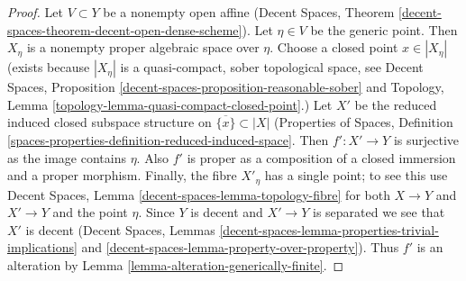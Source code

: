 \documentclass[10pt,a4paper]{amsart}
\theoremstyle{plain}
\theoremstyle{definition}
\theoremstyle{remark}
\numberwithin{equation}{subsection}
\begin{document}
\begin{proof}
Let $V \subset Y$ be a nonempty open affine
(Decent Spaces, Theorem \ref{decent-spaces-theorem-decent-open-dense-scheme}).
Let $\eta \in V$ be the generic point. Then
$X_\eta$ is a nonempty proper algebraic space over $\eta$.
Choose a closed point $x \in |X_\eta|$
(exists because $|X_\eta|$ is a quasi-compact, sober
topological space, see Decent Spaces, Proposition
\ref{decent-spaces-proposition-reasonable-sober}
and Topology, Lemma \ref{topology-lemma-quasi-compact-closed-point}.)
Let $X'$ be the reduced induced closed subspace structure on
$\overline{\{x\}} \subset |X|$ (Properties of Spaces, Definition
\ref{spaces-properties-definition-reduced-induced-space}.
Then $f' : X' \to Y$ is surjective as the image contains $\eta$.
Also $f'$ is proper as a composition of a closed immersion
and a proper morphism. Finally, the fibre $X'_\eta$ has a
single point; to see this use
Decent Spaces, Lemma \ref{decent-spaces-lemma-topology-fibre}
for both $X \to Y$ and $X' \to Y$ and the point $\eta$.
Since $Y$ is decent and $X' \to Y$ is separated we see that $X'$ is decent
(Decent Spaces, Lemmas
\ref{decent-spaces-lemma-properties-trivial-implications} and
\ref{decent-spaces-lemma-property-over-property}).
Thus $f'$ is an alteration by
Lemma \ref{lemma-alteration-generically-finite}.
\end{proof}
\end{document}
